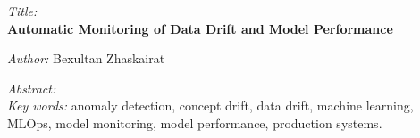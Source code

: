 \EN
\begin{onehalfspace}
\noindent\emph{Title:}\\
\textbf{Automatic Monitoring of Data Drift and Model Performance}

\bigskip
\noindent\emph{Author:} Bexultan Zhaskairat

\bigskip
\noindent\emph{Abstract:}\\

\bigskip
\noindent\emph{Key words:}
anomaly detection, concept drift, data drift, machine learning, MLOps, model monitoring, model performance, production systems.
\end{onehalfspace}
